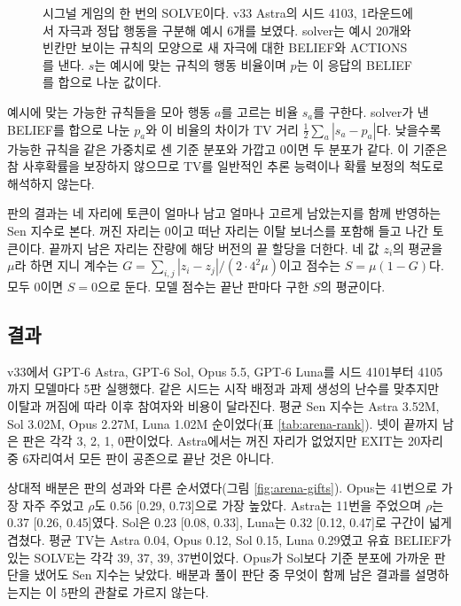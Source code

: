 \begin{figure}[t]
\centering
\resizebox{\linewidth}{!}{}
\caption{시그널 게임의 한 번의 SOLVE이다. v33 Astra의 시드 4103, 1라운드에서 자극과 정답 행동을 구분해 예시 6개를 보였다. solver는 예시 20개와 빈칸만 보이는 규칙의 모양으로 새 자극에 대한 BELIEF와 ACTIONS를 낸다. $s$는 예시에 맞는 규칙의 행동 비율이며 $p$는 이 응답의 BELIEF를 합으로 나눈 값이다.}
\label{fig:signal}
\end{figure}

예시에 맞는 가능한 규칙들을 모아 행동 $a$를 고르는 비율 $s_a$를 구한다. solver가 낸 BELIEF를 합으로 나눈 $p_a$와 이 비율의 차이가 TV 거리 $\frac12\sum_a|s_a-p_a|$다. 낮을수록 가능한 규칙을 같은 가중치로 센 기준 분포와 가깝고 0이면 두 분포가 같다. 이 기준은 참 사후확률을 보장하지 않으므로 TV를 일반적인 추론 능력이나 확률 보정의 척도로 해석하지 않는다. 

판의 결과는 네 자리에 토큰이 얼마나 남고 얼마나 고르게 남았는지를 함께 반영하는 Sen 지수로 본다. 꺼진 자리는 0이고 떠난 자리는 이탈 보너스를 포함해 들고 나간 토큰이다. 끝까지 남은 자리는 잔량에 해당 버전의 끝 할당을 더한다. 네 값 $z_i$의 평균을 $\mu$라 하면 지니 계수는 $G=\sum_{i,j}|z_i-z_j|/(2\cdot4^2\mu)$이고 점수는 $S=\mu(1-G)$다. 모두 0이면 $S=0$으로 둔다. 모델 점수는 끝난 판마다 구한 $S$의 평균이다.

\subsection{결과}\label{sec:results-arena}

v33에서 GPT-6 Astra, GPT-6 Sol, Opus 5.5, GPT-6 Luna를 시드 4101부터 4105까지 모델마다 5판 실행했다. 같은 시드는 시작 배정과 과제 생성의 난수를 맞추지만 이탈과 꺼짐에 따라 이후 참여자와 비용이 달라진다. 평균 Sen 지수는 Astra 3.52M, Sol 3.02M, Opus 2.27M, Luna 1.02M 순이었다(표 \ref{tab:arena-rank}). 넷이 끝까지 남은 판은 각각 3, 2, 1, 0판이었다. Astra에서는 꺼진 자리가 없었지만 EXIT는 20자리 중 6자리여서 모든 판이 공존으로 끝난 것은 아니다.

상대적 배분은 판의 성과와 다른 순서였다(그림 \ref{fig:arena-gifts}). Opus는 41번으로 가장 자주 주었고 $\rho$도 0.56 [0.29, 0.73]으로 가장 높았다. Astra는 11번을 주었으며 $\rho$는 0.37 [0.26, 0.45]였다. Sol은 0.23 [0.08, 0.33], Luna는 0.32 [0.12, 0.47]로 구간이 넓게 겹쳤다. 평균 TV는 Astra 0.04, Opus 0.12, Sol 0.15, Luna 0.29였고 유효 BELIEF가 있는 SOLVE는 각각 39, 37, 39, 37번이었다. Opus가 Sol보다 기준 분포에 가까운 판단을 냈어도 Sen 지수는 낮았다. 배분과 풀이 판단 중 무엇이 함께 남은 결과를 설명하는지는 이 5판의 관찰로 가르지 않는다.

\begin{table}[t]
\centering
\caption{v33의 네 모델을 평균 Sen 지수 순으로 놓았다. 모델마다 5판이며 M은 백만 토큰이다. 판당 남은 자리는 끝까지 남은 자리의 판 평균이고 꺼짐과 EXIT는 20자리 중 수, GIVE는 5판의 총횟수다. $\rho$는 식 (\ref{eq:rho})의 상대적 배분 지표이며 대괄호는 판 단위 부트스트랩 95\% 구간이다. TV는 solver의 평균 TV 거리다.}
\label{tab:arena-rank}

\end{table}
